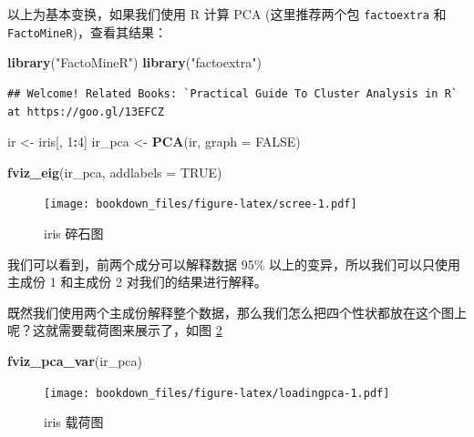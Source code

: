 \documentclass[
]{krantz}
\makeatletter
\newenvironment{Shaded}{\begin{snugshade}}{\end{snugshade}}
\newcommand{\DataTypeTok}[1]{\textcolor[rgb]{0.13,0.29,0.53}{#1}}
\newcommand{\DecValTok}[1]{\textcolor[rgb]{0.00,0.00,0.81}{#1}}
\newcommand{\KeywordTok}[1]{\textcolor[rgb]{0.13,0.29,0.53}{\textbf{#1}}}
\newcommand{\NormalTok}[1]{#1}
\newcommand{\OperatorTok}[1]{\textcolor[rgb]{0.81,0.36,0.00}{\textbf{#1}}}
\newcommand{\OtherTok}[1]{\textcolor[rgb]{0.56,0.35,0.01}{#1}}
\newcommand{\StringTok}[1]{\textcolor[rgb]{0.31,0.60,0.02}{#1}}
\newenvironment{kframe}{%
\medskip{}
\setlength{\fboxsep}{.8em}
 \def\at@end@of@kframe{}%
 \ifinner\ifhmode%
  \def\at@end@of@kframe{\end{minipage}}%
  \begin{minipage}{\columnwidth}%
 \fi\fi%
 \def\FrameCommand##1{\hskip\@totalleftmargin \hskip-\fboxsep
 \colorbox{shadecolor}{##1}\hskip-\fboxsep
     \hskip-\linewidth \hskip-\@totalleftmargin \hskip\columnwidth}%
 \MakeFramed {\advance\hsize-\width
   \@totalleftmargin\z@ \linewidth\hsize
   \@setminipage}}%
 {\par\unskip\endMakeFramed%
 \at@end@of@kframe}
\renewenvironment{Shaded}{\begin{kframe}}{\end{kframe}}
\makeatother
\begin{document}
以上为基本变换，如果我们使用 R 计算 PCA (这里推荐两个包 \texttt{factoextra} 和 \texttt{FactoMineR})，查看其结果：

\begin{Shaded}
\begin{Highlighting}[]
\KeywordTok{library}\NormalTok{(}\StringTok{"FactoMineR"}\NormalTok{)}
\KeywordTok{library}\NormalTok{(}\StringTok{"factoextra"}\NormalTok{)}
\end{Highlighting}
\end{Shaded}

\begin{verbatim}
## Welcome! Related Books: `Practical Guide To Cluster Analysis in R` at https://goo.gl/13EFCZ
\end{verbatim}

\begin{Shaded}
\begin{Highlighting}[]
\NormalTok{ir <-}\StringTok{ }\NormalTok{iris[, }\DecValTok{1}\OperatorTok{:}\DecValTok{4}\NormalTok{]}
\NormalTok{ir_pca <-}\StringTok{ }\KeywordTok{PCA}\NormalTok{(ir, }\DataTypeTok{graph =} \OtherTok{FALSE}\NormalTok{)}

\KeywordTok{fviz_eig}\NormalTok{(ir_pca, }\DataTypeTok{addlabels =} \OtherTok{TRUE}\NormalTok{)}
\end{Highlighting}
\end{Shaded}

\begin{figure}
\centering
\texttt{[image: bookdown\_files/figure-latex/scree-1.pdf]}
\caption{\label{fig:scree}iris 碎石图}
\end{figure}

我们可以看到，前两个成分可以解释数据 95\% 以上的变异，所以我们可以只使用主成份 1 和主成份 2 对我们的结果进行解释。

既然我们使用两个主成份解释整个数据，那么我们怎么把四个性状都放在这个图上呢？这就需要载荷图来展示了，如图 \ref{fig:loadingpca}

\begin{Shaded}
\begin{Highlighting}[]
\KeywordTok{fviz_pca_var}\NormalTok{(ir_pca)}
\end{Highlighting}
\end{Shaded}

\begin{figure}
\centering
\texttt{[image: bookdown\_files/figure-latex/loadingpca-1.pdf]}
\caption{\label{fig:loadingpca}iris 载荷图}
\end{figure}
\end{document}
